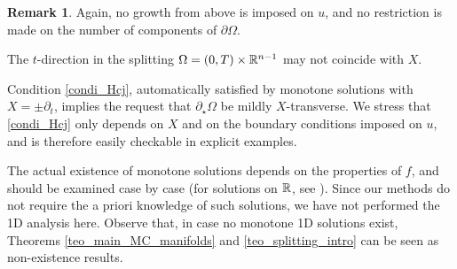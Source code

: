\documentclass[10 pt,a4paper]{article}
\theoremstyle{definition}
\newtheorem{remark}[definition]{Remark}
\begin{document}
\begin{remark}
	\item[-] Again, no growth from above is imposed on $u$, and no restriction is made on the number of components of $\partial \Omega$. 

%
	\item[-] The $t$-direction in the splitting $\Omega = (0,T) \times \mathbb R^{n-1}$ may not coincide with $X$. %
	\item[-] Condition \eqref{condi_Hcj}, automatically satisfied by monotone solutions with $X = \pm \partial_t$, implies the request that $\partial_\star \Omega$ be mildly $X$-transverse. We stress that \eqref{condi_Hcj} only depends on $X$ and on the boundary conditions imposed on $u$, and is therefore easily checkable in explicit examples.
	\item[-] The actual existence of monotone solutions depends on the properties of $f$, and should be examined case by case (for solutions on $\mathbb R$, see \cite{FSV}). Since our methods do not require the a priori knowledge of such solutions, we have not performed the 1D analysis here. Observe that, in case no monotone 1D solutions exist, Theorems \ref{teo_main_MC_manifolds} and \ref{teo_splitting_intro} can be seen as non-existence results. 	
\end{remark}
\end{document}
